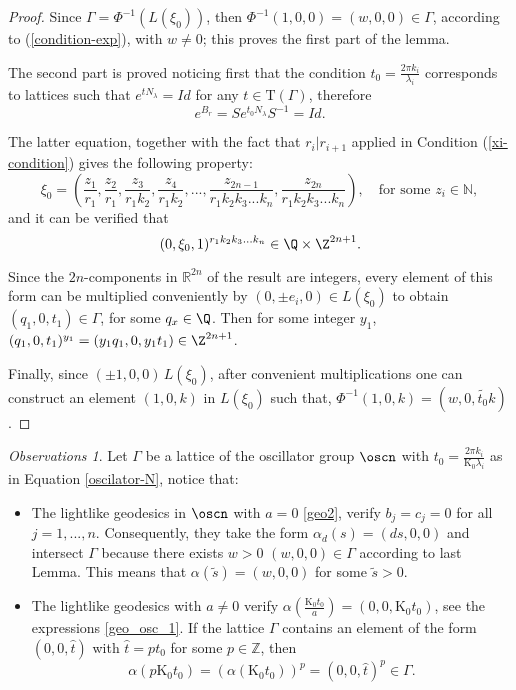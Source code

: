 \documentclass[12pt]{amsart}
\theoremstyle{plain}
\theoremstyle{definition}
\theoremstyle{remark}
\newtheorem{obs}[thm]{Observations}
\begin{document}
	\begin{proof}
		
		Since $\Gamma = \Phi^{-1}(L(\xi_0))$, then $\Phi^{-1}(1,0,0) = (w,0,0) \in \Gamma$, according to (\ref{condition-exp}), with $w \neq 0 $; this proves the first part of the lemma.
		
		The second part is proved noticing first that the condition $t_0 = \frac{2 \pi k_i}{\lambda_i}$ corresponds to lattices such that $e^{tN_\lambda} = Id$ for any $t \in \mathrm{T}(\Gamma)$, therefore $$e^{B_r} = Se^{t_0N_\lambda}S^{-1}=Id.$$
		
		The latter equation, together with the fact that $r_i | r_{i+1}$ applied in Condition (\ref{xi-condition}) gives the following property: $$\xi_0=(\frac{z_1}{r_1},\frac{z_2}{r_1}, \frac{z_3}{r_1 k_2}, \frac{z_4}{r_1 k_2}, ..., \frac{z_{2n-1}}{r_1 k_2 k_3 ... k_n}, \frac{z_{2n}}{r_1 k_2 k_3 ... k_n} ), \quad \mbox{for some } z_i \in \mathbb{N},$$ and it can be verified that $$(0,\xi_0,1)^{r_1 k_2 k_3 ... k_n} \in \Q \times \Z^{2n+1}. $$
		
		Since the $2n$-components in $\mathbb R^{2n}$ of the result are integers, every element of this form  can be multiplied conveniently by $(0, \pm e_i, 0) \in L(\xi_0)$ to obtain $(q_1, 0, t_1) \in \Gamma$, for some $q_x \in \Q$. Then for some integer $y_1$, $(q_1, 0, t_1)^{y_1} = (y_1 q_1, 0, y_1 t_1) \in \Z^{2n+1}$. 
		
		Finally, since $(\pm 1,0,0) \, L(\xi_0)$, after convenient multiplications one can construct an element $(1,0,k)$ in $L(\xi_0)$ such that, $\Phi^{-1}(1,0,k) = (w,0,\widetilde{t_0} k)$. 
		\end{proof}
	
	
	\begin{obs}\label{obs-osc}
		Let $\Gamma$ be a lattice of the oscillator group $\oscn$ with $t_0=\frac{2\pi k_i}{\mathrm{K_0} \lambda_i}$ as in Equation \eqref{oscilator-N}, notice that:
		\begin{itemize}
			\item The lightlike geodesics in $\oscn$ with $a=0$ \eqref{geo2}, verify $b_j=c_j=0$ for all $j=1,...,n$. Consequently, they take the form $ \alpha_d(s)=(ds,0,0)$ and intersect $\Gamma$ because there exists $w > 0$ $(w,0,0) \in \Gamma$ according to last Lemma. This means that  $\alpha(\tilde{s})=(w,0,0)$ for some $\tilde{s} > 0$.
			\item The lightlike geodesics with $a \neq 0$ verify $\alpha(\frac{\mathrm{K_0} t_0}{a}) = (0,0,\mathrm{K_0} t_0)$, see the expressions \eqref{geo_osc_1}. If the lattice  $\Gamma$ contains an element of the form $(0,0,\hat{t})$ with $\hat{t}=p t_0$ for some $p \in \mathbb{Z}$, then $$\alpha(p \mathrm{K_0} t_0) = (\alpha(\mathrm{K_0} t_0))^p = (0,0,\hat{t})^p \in \Gamma.$$ 
		\end{itemize}
	\end{obs}	
		
\end{document}
